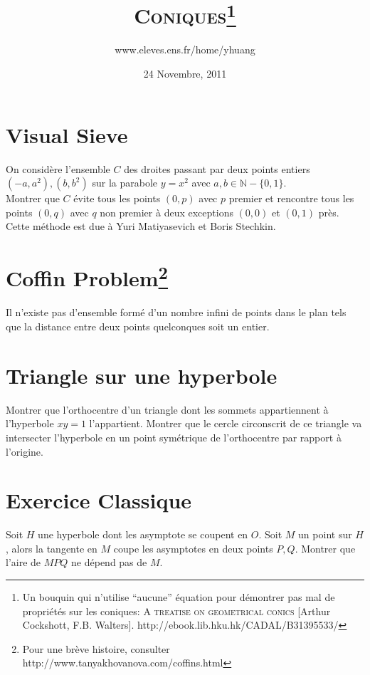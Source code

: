 \documentclass{article}
\begin{document}
\title{\textsc{Coniques}\footnote{Un bouquin qui n'utilise ``aucune'' \'equation pour d\'emontrer pas mal de propri\'et\'es sur les coniques: \textsc{A treatise on geometrical conics} [Arthur Cockshott, F.B. Walters]. http://ebook.lib.hku.hk/CADAL/B31395533/}}
\author{www.eleves.ens.fr/home/yhuang}
\date{24 Novembre, 2011}

\maketitle

\section{Visual Sieve}
On consid\`ere l'ensemble $C$ des droites passant par deux points entiers $(-a,a^2),(b,b^2)$ sur la parabole $y=x^2$ avec $a,b\in\mathbb{N}-\{0,1\}$.\\
Montrer que $C$ \'evite tous les points $(0,p)$ avec $p$ premier et rencontre tous les points $(0,q)$ avec $q$ non premier \`a deux exceptions $(0,0)$ et $(0,1)$ pr\`es.\\
Cette m\'ethode est due \`a Yuri Matiyasevich et Boris Stechkin.

\section{Coffin Problem\protect\footnote{Pour une br\`eve histoire, consulter http://www.tanyakhovanova.com/coffins.html}}
Il n'existe pas d'ensemble form\'e d'un nombre infini de points dans le plan tels que la distance entre deux points quelconques soit un entier.

\section{Triangle sur une hyperbole}
Montrer que l'orthocentre d'un triangle dont les sommets appartiennent \`a l'hyperbole $xy=1$ l'appartient. Montrer que le cercle circonscrit de ce triangle va intersecter l'hyperbole en un point sym\'etrique de l'orthocentre par rapport \`a l'origine.

\section{Exercice Classique}
Soit $H$ une hyperbole dont les asymptote se coupent en $O$. Soit $M$ un point sur $H$, alors la tangente en $M$ coupe les asymptotes en deux points $P,Q$. Montrer que l'aire de $MPQ$ ne d\'epend pas de $M$.
\end{document}
